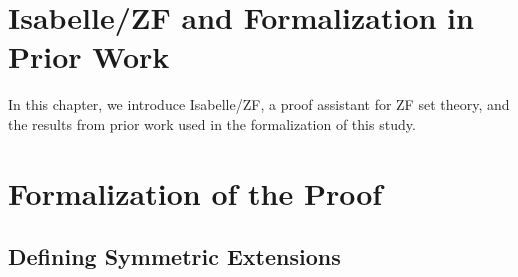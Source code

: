 \documentclass{report}
\newcommand{\Pbb}{\mathbb{P}}
\begin{document}
\chapter{Isabelle/ZF and Formalization in Prior Work}
In this chapter, we introduce Isabelle/ZF, a proof assistant for ZF set theory, 
and the results from prior work used in the formalization of this study.
\begin{comment}  
\section{Isabelle/ZF}
\section{Internalized First-Order Formulas}
\section{Forcing}  
\end{comment}

\chapter{Formalization of the Proof} 
\section{Defining Symmetric Extensions}
\begin{comment}
  \subsection{$\Pbb$-names}
\subsection{Automorphisms}
\subsection{Hereditarily Symmetric Names}
\subsection{Symmetric Extensions}
\end{comment}
\end{document}

